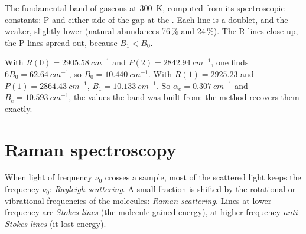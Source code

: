 \begin{omfigure}

{\small The fundamental band of gaseous  at \qty{300}{K}, computed from
its spectroscopic constants: P and  either side of the gap at the
. Each line is a doublet,  and the weaker, slightly
lower  (natural abundances 76\,\% and 24\,\%). The R lines close up,
the P lines spread out, because $B_1 < B_0$.}
\end{omfigure}

\begin{example}\label{ex:b3:rovibrational-spectroscopy:analysis}
With $R(0) = \qty{2905.58}{cm^{-1}}$ and $P(2) = \qty{2842.94}{cm^{-1}}$, one finds
$6B_0 = \qty{62.64}{cm^{-1}}$, so $B_0 = \qty{10.440}{cm^{-1}}$. With $R(1) = 2925.23$ and $P(1) =
\qty{2864.43}{cm^{-1}}$, $B_1 = \qty{10.133}{cm^{-1}}$. So $\alpha_e = \qty{0.307}{cm^{-1}}$
and $B_e = \qty{10.593}{cm^{-1}}$, the values the band was built from:
the method recovers them exactly.
\end{example}

\section{Raman spectroscopy}

\begin{definition}\label{def:b3:rovibrational-spectroscopy:raman}
When light of frequency $\nu_0$ crosses a sample, most of the scattered light
keeps the frequency $\nu_0$: \emph{Rayleigh scattering}.
A small fraction is shifted by the rotational or vibrational
frequencies of the molecules: \emph{Raman scattering}.
Lines at lower frequency are \emph{Stokes lines} (the
molecule gained energy), at higher frequency \emph{anti-Stokes
lines} (it lost energy).
\end{definition}

